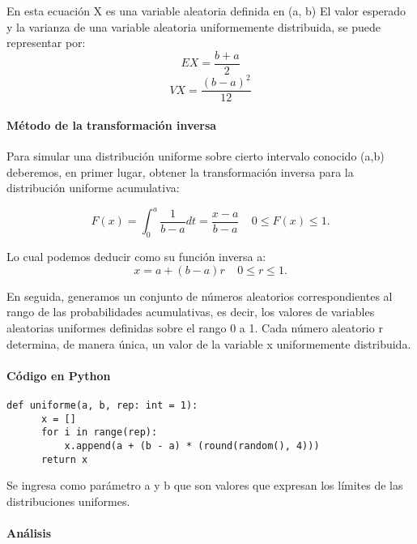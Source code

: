 \documentclass{article}
\begin{document}
  En esta ecuación  X es una variable aleatoria definida en (a, b)
  El valor esperado y la varianza de una variable aleatoria uniformemente distribuida, se puede representar por:
  \begin{equation}
    EX = \frac{b+a}{2}
  \end{equation}
  \begin{equation}
    VX = \frac{(b-a)^2}{12}
  \end{equation}

      \paragraph{Método de la transformación inversa\newline}
  Para simular una distribución uniforme sobre cierto intervalo conocido (a,b) deberemos, en primer lugar, obtener la
  transformación inversa para la distribución uniforme acumulativa:

  \begin{equation}
    F(x) = \int_{0}^{a}\frac{1}{b-a}dt = \frac{x-a}{b-a} \ \text{  } \ 0 \leq F(x) \leq 1.
  \end{equation}

  Lo cual podemos deducir como su función inversa a:
  \begin{equation}
  x = a +(b-a)r \ \text{  }\ 0 \leq r \leq 1.
  \end{equation}

  En seguida, generamos un conjunto de números aleatorios correspondientes al rango de las probabilidades acumulativas,
  es decir, los valores de variables aleatorias uniformes definidas sobre el rango 0 a 1. Cada número aleatorio r determina,
  de manera única, un valor de la variable x uniformemente distribuida.

  \paragraph{Código en Python}
  \begin{lstlisting}[style = Python]
    def uniforme(a, b, rep: int = 1):
      x = []
      for i in range(rep):
          x.append(a + (b - a) * (round(random(), 4)))
      return x
  \end{lstlisting}
  Se ingresa como parámetro a y b que son valores que expresan los límites de las distribuciones uniformes.


  \paragraph{Análisis\newline}
\end{document}
